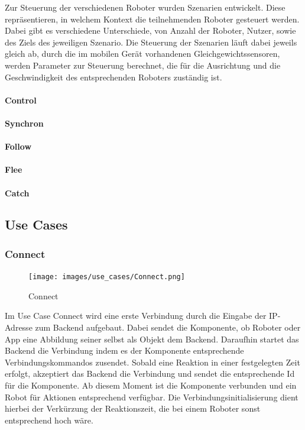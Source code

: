 Zur Steuerung der verschiedenen Roboter wurden Szenarien entwickelt. Diese repräsentieren, in welchem Kontext die teilnehmenden Roboter gesteuert werden. Dabei gibt es verschiedene Unterschiede, von Anzahl der Roboter, Nutzer, sowie des Ziels des jeweiligen Szenario. Die Steuerung der Szenarien läuft dabei jeweils gleich ab, durch die im mobilen Gerät vorhandenen Gleichgewichtssensoren, werden Parameter zur Steuerung berechnet, die für die Ausrichtung und die Geschwindigkeit des entsprechenden Roboters zuständig ist.





\paragraph{Control}



\paragraph{Synchron}
\paragraph{Follow}
\paragraph{Flee}
\paragraph{Catch}

\subsection{Use Cases}
\subsubsection{Connect}

\begin{figure}[h]
	\begin{center}
		\texttt{[image: images/use\_cases/Connect.png]}
	\end{center}
	\caption{Connect}
	\label{fig:UC_Connect}
\end{figure}

\noindent
Im Use Case Connect wird eine erste Verbindung durch die Eingabe der IP-Adresse zum Backend aufgebaut. Dabei sendet die Komponente, ob Roboter oder App eine Abbildung seiner selbst als Objekt dem Backend. Daraufhin startet das Backend die Verbindung indem es der Komponente entsprechende Verbindungskommandos zusendet. Sobald eine Reaktion in einer festgelegten Zeit erfolgt, akzeptiert das Backend die Verbindung und sendet die entsprechende Id für die Komponente. Ab diesem Moment ist die Komponente verbunden und ein Robot für Aktionen entsprechend verfügbar. Die Verbindungsinitialisierung dient hierbei der Verkürzung der Reaktionszeit, die bei einem Roboter sonst entsprechend hoch wäre.

